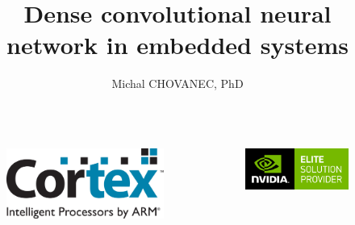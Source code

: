 \documentclass[xcolor=dvipsnames]{beamer}
\title{\bf Dense convolutional neural network in embedded systems}
\author{Michal CHOVANEC, PhD}
\date[EURP]{}
\begin{document}
\begin{frame}
\titlepage


\begin{columns}
\begin{column}{0.5\textwidth}

  \begin{figure}
    \includegraphics[scale=0.15]{../pictures/arm_cortex.jpg}
  \end{figure}

\end{column}
\begin{column}{0.5\textwidth}  %

  \begin{figure}
  \includegraphics[scale=0.1]{../pictures/nvidia.png}
  \end{figure}

\end{column}
\end{columns}

\end{frame}
\end{document}
